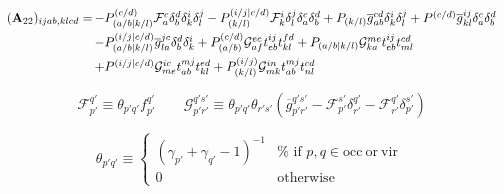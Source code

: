 \begin{subappendices}
\begin{equation}
    \label{eq:a22-odc12-formula}
    \begin{array}{r@{\,}l}
        (\mathbf{A}_{22})_{ijab,klcd}
        =
        &
        -
        P_{(a/b|k/l)}^{(c/d)}
        \mathcal{F}_a^c
        \delta_b^d
        \delta_k^i
        \delta_l^j
        -
        P_{(k/l)}^{(i/j|c/d)}
        \mathcal{F}_k^i
        \delta_l^j
        \delta_a^c
        \delta_b^d
        +
        P_{(k/l)}
        \overline{g}_{ab}^{cd}
        \delta_k^i
        \delta_l^j
        +
        P^{(c/d)}
        \overline{g}_{kl}^{ij}
        \delta_a^c
        \delta_b^d
        \\[5pt]
        &
        -
        P_{(a/b|k/l)}^{(i/j|c/d)}
        \overline{g}_{la}^{jc}
        \delta_b^d
        \delta_k^i
        +
        P_{(a/b)}^{(c/d)}
        \mathcal{G}_{af}^{ec}
        t_{eb}^{ij}
        t_{kl}^{fd}
        +
        P_{(a/b|k/l)}
        \mathcal{G}_{ka}^{me}
        t_{eb}^{ij}
        t_{ml}^{cd}
        \\[5pt]
        &
        +
        P^{(i/j|c/d)}
        \mathcal{G}_{me}^{ic}
        t_{ab}^{mj}
        t_{kl}^{ed}
        +
        P_{(k/l)}^{(i/j)}
        \mathcal{G}_{mk}^{in}
        t_{ab}^{mj}
        t_{nl}^{cd}
    \end{array}
\end{equation}

\begin{equation}
    \mathcal{F}_{p'}^{q'}
    \equiv
    \theta_{p'q'}
    f_{p'}^{q'}
    \qquad
    \mathcal{G}_{p'r'}^{q's'}
    \equiv
    \theta_{p'q'}
    \theta_{r's'}
    (
        \overline{g}_{p'r'}^{q's'}
        -
        \mathcal{F}_{p'}^{s'}
        \delta_{r'}^{q'}
        -
        \mathcal{F}_{r'}^{q'}
        \delta_{p'}^{s'}
    )
\end{equation}

\begin{equation}
    \theta_{p'q'}
    \equiv
    \left\{
        \begin{array}{cc}
            (
                \gamma_{p'}
                +
                \gamma_{q'}
                -
                1
            )^{-1}
            &
            \text{%
                if
                \(p,q\in \mathrm{occ \ or \ vir}\)
            }
            \\
            0
            &
            \text{otherwise}
        \end{array}
    \right.
\end{equation}


\end{subappendices}
